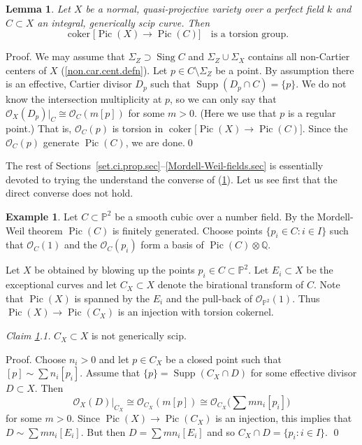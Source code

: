 \documentclass{amsart}
\newtheorem{lem}[thm]{Lemma}
\theoremstyle{definition}
\newtheorem{exmp}[thm]{Example}
\theoremstyle{remark}
\renewcommand{\o}[0]{{\mathcal O}}
\newcommand{\p}[0]{{\mathbb P}}
\newcommand{\q}[0]{{\mathbb Q}}
\newcommand{\qtq}[1]{\quad\mbox{#1}\quad}
\newcommand{\pic}[0]{\operatorname{Pic}}
\newcommand{\supp}[0]{\operatorname{Supp}}
\newcommand{\coker}[0]{\operatorname{coker}}
\newcommand{\sing}[0]{\operatorname{Sing}}
\newcommand{\tsum}[0]{\textstyle{\sum}}
\begin{document}
\medskip



\begin{lem} \label{ci.to.rc.lem}
Let $X$ be a normal, quasi-projective variety over a perfect field $k$ and $C\subset X$ an integral,   generically scip  curve.
Then 
$$\coker\bigl[\pic(X)\to \pic(C)\bigr]\qtq{is a torsion group.}
$$
\end{lem}

Proof.  We may assume that $\Sigma_Z\supset \sing C$ and
$\Sigma_Z\cup \Sigma_X$ contains all non-Cartier centers of $X$   (\ref{non.car.cent.defn}).
  Let $p\in C\setminus \Sigma_Z$ be a  point. By assumption 
there is an effective, Cartier  divisor $D_p$ 
such that $\supp(D_p\cap C)=\{p\}$. We do not know the intersection multiplicity at $p$,
so we can only say that  $\o_X(D_p)|_C\cong \o_C(m[p])$
for some $m>0$. (Here we use that $p$ is a regular point.) That is, $\o_C(p)$ is  torsion in
$\coker\bigl[\pic(X)\to \pic(C)\bigr]$. Since the $\o_C(p)$ generate
$\pic(C)$, we are done.\qed
\medskip

The rest of Sections~\ref{set.ci.prop.sec}--\ref{Mordell-Weil-fields.sec}  is essentially devoted to trying the understand the converse of (\ref{ci.to.rc.lem}).
Let us see first that the direct converse does not hold.

\begin{exmp} \label{rc.to.ci.1.exmp}
Let $C\subset \p^2$ be a smooth cubic over a number field. By the Mordell-Weil theorem 
$\pic(C)$ is finitely generated. Choose points  $\{p_i\in C: i\in I\}$ such that
$\o_C(1)$ and the $\o_C(p_i)$ form a basis of $\pic(C)\otimes\q$. 

Let $X$ be obtained by blowing up the points $p_i\in C\subset \p^2$.
Let $E_i\subset X$ be the exceptional curves
and let $C_X\subset X$  denote the  birational transform of $C$.
Note that $\pic(X)$ is spanned by the $E_i$  and the pull-back of $\o_{\p^2}(1)$.  Thus  $\pic(X)\to \pic(C_X)$ is an injection with torsion cokernel.  
\medskip

{\it Claim \ref{rc.to.ci.1.exmp}.1.}   $C_X\subset X$ is not generically scip.
\medskip

Proof. Choose $n_i>0$ and let $p\in C_X$ be a closed point such that
$[p]\sim \sum n_i[p_i]$.  Assume that $\{p\}=\supp(C_X\cap D)$ for some effective divisor $D\subset X$. Then  
$$
\o_X(D)|_{C_X}\cong \o_{C_X}(m[p])\cong \o_{C_X}\bigl(\tsum mn_i[p_i]\bigr)
$$
for some $m>0$. Since $\pic(X)\to \pic(C_X)$ is an injection,
this implies that
$D\sim \sum mn_i[E_i]$. But then $D= \sum mn_i[E_i]$ and
so $C_X\cap D=\{p_i:i\in I\}$. \qed
\end{exmp}
\end{document}
